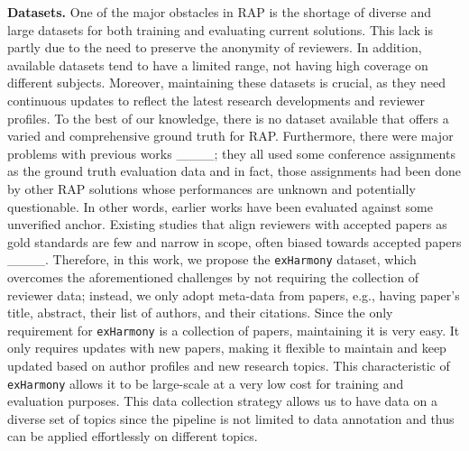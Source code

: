 \textbf{Datasets.}
One of the major obstacles in RAP is the shortage of diverse and large datasets for both training and evaluating current solutions. This lack is partly due to the need to preserve the anonymity of reviewers. In addition, available datasets tend to have a limited range, not having high coverage on different subjects. Moreover, maintaining these datasets is crucial, as they need continuous updates to reflect the latest research developments and reviewer profiles. To the best of our knowledge, there is no dataset available that offers a varied and comprehensive ground truth for RAP. 
Furthermore, there were major problems with previous works ____; they all used some conference assignments as the ground truth evaluation data and in fact, those assignments had been done by other RAP solutions whose performances are  unknown and potentially questionable. In other words, earlier works have been evaluated against some unverified anchor. Existing studies that align reviewers with accepted papers as gold standards are few and narrow in scope, often biased towards accepted papers ____. Therefore, in this work, we propose the \texttt{exHarmony} dataset, which overcomes the aforementioned challenges by not requiring the collection of reviewer data; instead, we only adopt meta-data from papers, e.g., having paper's title, abstract, their list of authors, and their citations. Since the only requirement for \texttt{exHarmony} is a collection of papers, maintaining it is very easy. It only requires updates with new papers, making it flexible to maintain and keep updated based on author profiles and new research topics.
This characteristic of \texttt{exHarmony} allows it to be large-scale at a very low cost for training and evaluation purposes. This data collection strategy allows us to have data on a diverse set of topics since the pipeline is not limited to data annotation and thus can be applied effortlessly on different topics.
    
